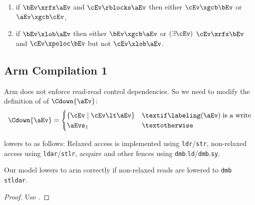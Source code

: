 \begin{definition}
\begin{enumerate}[resume,label=(\textsc{a}\arabic*),ref=\textsc{a}\arabic*]
\begin{enumerate}
    \item if $\bEv\xrfx\aEv$ and $\cEv\rblocks\aEv$ then either $\cEv\xgcb\bEv$ or $\aEv\xgcb\cEv$,
    \item if $\bEv\xlob\aEv$ then either $\bEv\xgcb\aEv$ or $(\exists\cEv)$
      $\cEv\xrfx\bEv$ and $\cEv\xpoloc\bEv$ but not $\cEv\xlob\aEv$.
    \end{enumerate}
  \end{enumerate}
\end{definition}

\subsection{Arm Compilation 1}

Arm does not enforce read-read control dependencies.  So we need to modify
the definition of of $\Cdown{\aEv}$:
\begin{displaymath}
  \Cdown{\aEv}=
  \begin{cases}
    \{ \cEv \mid \cEv \lt \aEv \} & \textif \labeling(\aEv) \;\text{is a write}
    \\
    \aEvs_1 & \textotherwise
  \end{cases}
\end{displaymath}

\citet{DBLP:journals/pacmpl/PodkopaevLV19} lowers to \armeight{} as
follows: Relaxed access is implemented using \texttt{ldr}/\texttt{str},
non-relaxed access using \texttt{ldar}/\texttt{stlr}, acquire and other
fences using \texttt{dmb}.\texttt{ld}/\texttt{dmb}.\texttt{sy}.

\begin{theorem}
  Our model lowers to arm correctly if non-relaxed reads are lowered to
  \texttt{dmb st}\SEMI\texttt{ldar}.
  \vspace{-.5\baselineskip}
  \begin{proof}
    Use \EGC{}.
  \end{proof}  
\end{theorem}

